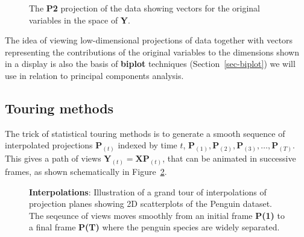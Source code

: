 \documentclass[
  letterpaper,
  10pt,
  krantz2]{krantz}
\begin{document}
{\begin{figure}
{}

\caption{\label{fig-proj-P2-vec}The \textbf{P2} projection of the data
showing vectors for the original variables in the space of \textbf{Y}.}

\end{figure}%

The idea of viewing low-dimensional projections of data together with
vectors representing the contributions of the original variables to the
dimensions shown in a display is also the basis of \textbf{biplot}
techniques (Section~\ref{sec-biplot}) we will use in relation to
principal components analysis.

\subsection{Touring methods}\label{touring-methods}

The trick of statistical touring methods is to generate a smooth
sequence of interpolated projections \(\mathbf{P}_{(t)}\) indexed by
time \(t\),
\(\mathbf{P}_{(1)}, \mathbf{P}_{(2)}, \mathbf{P}_{(3)}, \dots, \mathbf{P}_{(T)}\).
This gives a path of views
\(\mathbf{Y}_{(t)} = \mathbf{X} \mathbf{P}_{(t)}\), that can be animated
in successive frames, as shown schematically in
Figure~\ref{fig-peng-tourr-diagram}.

\begin{figure}


\caption{\label{fig-peng-tourr-diagram}\textbf{Interpolations}:
Illustration of a grand tour of interpolations of projection planes
showing 2D scatterplots of the Penguin dataset. The seqeunce of views
moves smoothly from an initial frame \textbf{P(1)} to a final frame
\textbf{P(T)} where the penguin species are widely separated.}


\end{figure}}
\end{document}
